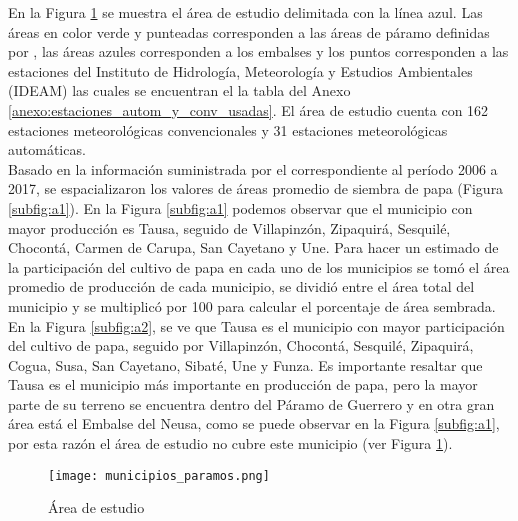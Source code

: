 En la Figura \ref{gra:areas} se muestra el área de estudio delimitada con la línea azul. Las áreas en color verde y punteadas corresponden a las áreas de páramo definidas por \citet{Cortes-Duque2013}, las áreas azules corresponden a los embalses y los puntos corresponden a las estaciones del Instituto de Hidrología, Meteorología y Estudios Ambientales (IDEAM) las cuales se encuentran el la tabla del Anexo \ref{anexo:estaciones_autom_y_conv_usadas}. El área de estudio cuenta con 162 estaciones meteorológicas convencionales y 31  estaciones meteorológicas automáticas.\\ %


Basado en la información suministrada por el \citet{madr2017} correspondiente al período 2006 a 2017, se espacializaron los valores de áreas promedio de siembra de papa (Figura \ref{subfig:a1}). En la Figura \ref{subfig:a1} podemos observar que el municipio con mayor producción es Tausa, seguido de Villapinzón, Zipaquirá, Sesquilé, Chocontá, Carmen de Carupa, San Cayetano y Une. Para hacer un estimado de la participación del cultivo de papa en cada uno de los municipios se tomó el área promedio de producción de cada municipio, se dividió entre el área total del municipio y se multiplicó por 100 para calcular el porcentaje de área sembrada. En la Figura \ref{subfig:a2}, se ve que Tausa es el municipio con mayor participación del cultivo de papa, seguido por Villapinzón, Chocontá, Sesquilé, Zipaquirá, Cogua, Susa, San Cayetano, Sibaté, Une y Funza. Es importante resaltar que Tausa es el municipio más importante en producción de papa, pero la mayor parte de su terreno se encuentra dentro del Páramo de Guerrero y en otra gran área está el Embalse del Neusa, como se puede observar en la Figura \ref{subfig:a1}, por esta razón el área de estudio no cubre este municipio (ver Figura \ref{gra:areas}).


\begin{figure}[H]
	\begin{center}
		\texttt{[image: municipios\_paramos.png]}
		\label{gra:areas_paramo}
	\end{center}
    	\caption{Área de estudio}
	\label{gra:areas}
\end{figure}
	

